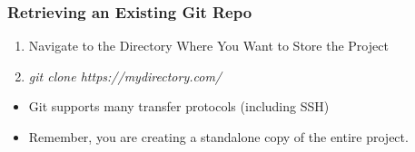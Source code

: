 \begin{frame}
\frametitle{\large{Retrieving an Existing Git Repo}}
\begin{enumerate}
\item Navigate to the Directory Where You Want to Store the Project
\item \emph{git clone https://mydirectory.com/}
\end{enumerate}
\vspace{5mm}
\begin{itemize}
\item Git supports many transfer protocols (including SSH)
\item Remember, you are creating a standalone copy of the entire project.
\end{itemize}
\end{frame}
\note{}